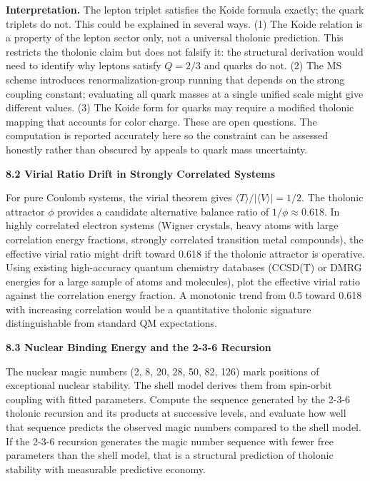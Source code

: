 \documentclass[
  11pt,
  letterpaper,
]{article}
\begin{document}
\textbf{Interpretation.} The lepton triplet satisfies the Koide formula
exactly; the quark triplets do not. This could be explained in several
ways. (1) The Koide relation is a property of the lepton sector only,
not a universal tholonic prediction. This restricts the tholonic claim
but does not falsify it: the structural derivation would need to
identify why leptons satisfy \(Q = 2/3\) and quarks do not. (2) The
\(\overline{\text{MS}}\) scheme introduces renormalization-group running
that depends on the strong coupling constant; evaluating all quark
masses at a single unified scale might give different values. (3) The
Koide form for quarks may require a modified tholonic mapping that
accounts for color charge. These are open questions. The computation is
reported accurately here so the constraint can be assessed honestly
rather than obscured by appeals to quark mass uncertainty.

\textbf{8.2 Virial Ratio Drift in Strongly Correlated Systems}

For pure Coulomb systems, the virial theorem gives
\(\langle T \rangle / |\langle V \rangle| = 1/2\). The tholonic
attractor \(\phi\) provides a candidate alternative balance ratio of
\(1/\phi \approx 0.618\). In highly correlated electron systems (Wigner
crystals, heavy atoms with large correlation energy fractions, strongly
correlated transition metal compounds), the effective virial ratio might
drift toward 0.618 if the tholonic attractor is operative. Using
existing high-accuracy quantum chemistry databases (CCSD(T) or DMRG
energies for a large sample of atoms and molecules), plot the effective
virial ratio against the correlation energy fraction. A monotonic trend
from 0.5 toward 0.618 with increasing correlation would be a
quantitative tholonic signature distinguishable from standard QM
expectations.

\textbf{8.3 Nuclear Binding Energy and the 2-3-6 Recursion}

The nuclear magic numbers (2, 8, 20, 28, 50, 82, 126) mark positions of
exceptional nuclear stability. The shell model derives them from
spin-orbit coupling with fitted parameters. Compute the sequence
generated by the 2-3-6 tholonic recursion and its products at successive
levels, and evaluate how well that sequence predicts the observed magic
numbers compared to the shell model. If the 2-3-6 recursion generates
the magic number sequence with fewer free parameters than the shell
model, that is a structural prediction of tholonic stability with
measurable predictive economy.
\end{document}

